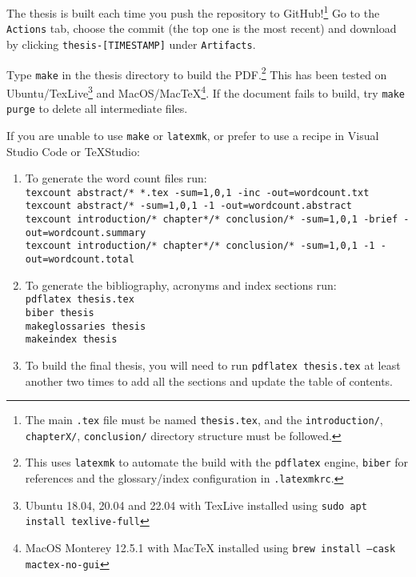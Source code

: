 
The thesis is built each time you push the repository to GitHub!\footnote{The main \texttt{.tex}
file must be named \texttt{thesis.tex}, and the \texttt{introduction/}, \texttt{chapterX/},
\texttt{conclusion/} directory structure must be followed.} Go to the \texttt{Actions}
tab, choose the commit (the top one is the most recent) and download by clicking \texttt{thesis-[TIMESTAMP]}
under \texttt{Artifacts}.


Type \texttt{make} in the thesis directory to build the PDF.\footnote{This uses \texttt{latexmk}
to automate the build with the \texttt{pdflatex} engine, \texttt{biber} for references and
the glossary/index configuration in \texttt{.latexmkrc}.} This has been tested on
Ubuntu/TexLive\footnote{Ubuntu 18.04, 20.04 and 22.04 with TexLive installed using \texttt{sudo apt install texlive-full}}
and MacOS/MacTeX\footnote{MacOS Monterey 12.5.1 with MacTeX installed using \texttt{brew install --cask mactex-no-gui}}.
If the document fails to build, try \texttt{make purge} to delete all intermediate files.

If you are unable to use \texttt{make} or \texttt{latexmk}, or prefer to use a recipe in
Visual Studio Code or TeXStudio:
\begin{enumerate}
  \item To generate the word count files run:\vspace{1ex}\\
    \texttt{\small texcount abstract/* *.tex -sum=1,0,1 -inc -out=wordcount.txt\\
    texcount abstract/* -sum=1,0,1 -1 -out=wordcount.abstract\\
    texcount introduction/* chapter*/* conclusion/* -sum=1,0,1 -brief -out=wordcount.summary\\
    texcount introduction/* chapter*/* conclusion/* -sum=1,0,1 -1 -out=wordcount.total}\\
  \item To generate the bibliography, acronyms and index sections run:\vspace{1ex}\\
    \texttt{\small pdflatex thesis.tex\\
    biber thesis\\
    makeglossaries thesis\\
    makeindex thesis}
  \item To build the final thesis, you will need to run \texttt{pdflatex thesis.tex} at least
    another two times to add all the sections and update the table of contents.
\end{enumerate}
